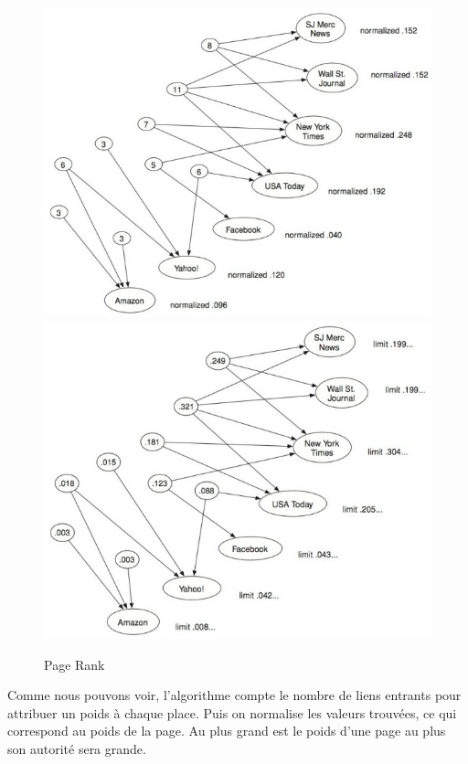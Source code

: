 \begin{figure}[!ht]
\centering

\includegraphics[scale=0.45]{images/ref/fig-14-4.jpeg}
\includegraphics[scale=0.45]{images/ref/fig-14-5.jpeg}
\caption{Page Rank}
\label{pageRankNews2}
\end{figure}



\newpage

	
Comme nous pouvons voir, l'algorithme compte le nombre de liens entrants pour attribuer un poids à chaque place. Puis on normalise les valeurs trouvées, ce qui correspond au poids de la page.
Au plus grand est le poids d'une page au plus son autorité sera grande.

